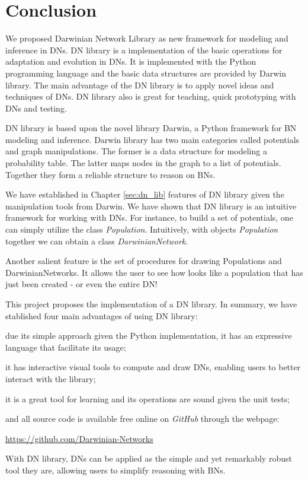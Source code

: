 \chapter{Conclusion}
\label{sec:conclusion}

We proposed Darwinian Network Library as new framework for modeling and inference in DNs.
DN library is a implementation of the basic operations for adaptation and evolution in DNs.
It is implemented with the Python programming language and the basic data structures are provided by Darwin library.
The main advantage of the DN library is to apply novel ideas and techniques of DNs.
DN library also is great for teaching, quick prototyping with DNs and testing.


DN library is based upon the novel library Darwin, a Python framework for BN modeling and inference.
Darwin library has two main categories called potentials and graph manipulations.
The former is a data structure for modeling a probability table.
The latter maps nodes in the graph to a list of potentials.
Together they form a reliable structure to reason on BNs.

We have established in Chapter \ref{sec:dn_lib} features of DN library given the manipulation tools from Darwin.
We have shown that DN library is an intuitive framework for working with DNs.
For instance, to build a set of potentials, one can simply utilize the class \emph{Population}.
Intuitively, with objects \emph{Population} together we can obtain a class \emph{DarwinianNetwork}.

Another salient feature is the set of procedures for drawing Populations and DarwinianNetworks.
It allows the user to see how looks like a population that has just been created - or even the entire DN!


This project proposes the implementation of a DN library.
In summary, we have stablished four main advantages of using DN library:
\begin{inparaenum}[(i)]
\item due its simple approach given the Python implementation, it has an expressive language that facilitate its usage;
\item it has interactive visual tools to compute and draw DNs, enabling users to better interact with the library;
\item it is a great tool for learning and its operations are sound given the unit tests;
\item and all source code is available free online on \emph{GitHub} through the webpage:
\end{inparaenum}
\begin{center}
\url{https://github.com/Darwinian-Networks}
\end{center}
With DN library, DNs can be applied as the simple and yet remarkably robust tool they are, allowing users to simplify reasoning with BNs.
